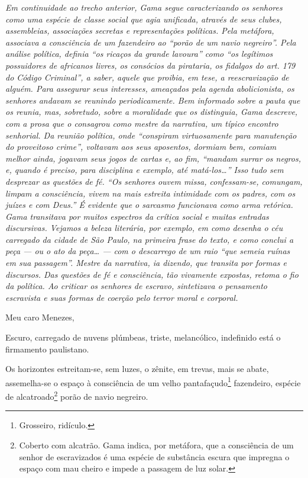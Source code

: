 {\begin{resumo}
\emph{Em continuidade ao trecho anterior, Gama segue caracterizando os
senhores como uma espécie de classe social que agia unificada, através
de seus clubes, assembleias, associações secretas e representações
políticas. Pela metáfora, associava a consciência de um fazendeiro ao
``porão de um navio negreiro''. Pela análise política, definia ``os ricaços
da grande lavoura'' como ``os legítimos possuidores de africanos livres,
os consócios da pirataria, os fidalgos do art. 179 do Código Criminal'',
a saber, aquele que proibia, em tese, a reescravização de alguém. Para
assegurar seus interesses, ameaçados pela agenda abolicionista, os
senhores andavam se reunindo periodicamente. Bem informado sobre a pauta
que os reunia, mas, sobretudo, sobre a moralidade que os distinguia,
Gama descreve, com a prosa que o consagrou como mestre da narrativa, um
típico encontro senhorial. Da reunião política, onde ``conspiram
virtuosamente para manutenção do proveitoso crime'', voltavam aos seus
aposentos, dormiam bem, comiam melhor ainda, jogavam seus jogos de
cartas e, ao fim, ``mandam surrar os negros, e, quando é preciso, para
disciplina e exemplo, até matá-los\ldots{}'' Isso tudo sem desprezar as
questões de fé. ``Os senhores ouvem missa, confessam-se, comungam, limpam
a consciência, vivem na mais estreita intimidade com os padres, com os
juízes e com Deus.'' É evidente que o sarcasmo funcionava como arma
retórica. Gama transitava por muitos espectros da crítica social e
muitas entradas discursivas. Vejamos a beleza literária, por exemplo, em
como desenha o céu carregado da cidade de São Paulo, na primeira frase
do texto, e como conclui a peça --- ou o ato da peça\ldots{} --- com o
descarrego de um raio ``que semeia ruínas em sua passagem''. Mestre da
narrativa, ia dizendo, que transita por formas e discursos. Das questões
de fé e consciência, tão vivamente expostas, retoma o fio da política.
Ao criticar os senhores de escravo, sintetizava o pensamento
escravista e suas formas de coerção pelo terror moral e corporal. }
\end{resumo}\pagebreak

Meu caro Menezes,

Escuro, carregado de nuvens plúmbeas, triste, melancólico, indefinido
está o firmamento paulistano.

Os horizontes estreitam-se, sem luzes, o zênite, em trevas, mais se
abate, assemelha-se o espaço à consciência de um velho
pantafaçudo\footnote{Grosseiro, ridículo.} fazendeiro, espécie de
alcatroado\footnote{Coberto com alcatrão. Gama indica, por metáfora,
  que a consciência de um senhor de escravizados é uma espécie de
  substância escura que impregna o espaço com mau cheiro e impede a
  passagem de luz solar.} porão de navio negreiro.

}
